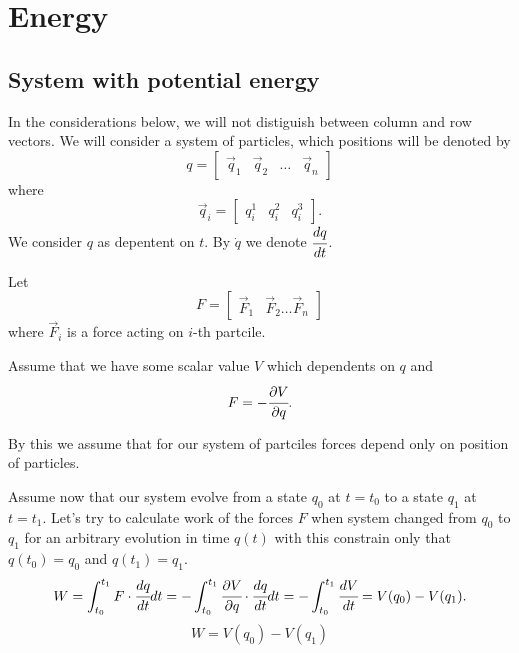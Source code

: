 \documentclass[main.tex]{subfiles}
\begin{document}
\section{Energy}
\subsection{System with potential energy}
\label{potential_energy}
In the considerations below, we will not distiguish between column and row vectors.
We will consider a system of particles, which positions will be denoted by
\begin{equation}
q = 
\begin{bmatrix}
\vec{q}_1 &
\vec{q}_2 &
\dots &
\vec{q}_n 
\end{bmatrix}
\end{equation}
where
\begin{equation}
\vec{q}_i = 
\begin{bmatrix}
q^1_i & 
q^2_i & 
q^3_i
\end{bmatrix}.
\end{equation}
We consider $q$ as depentent on $t$. By $\dot{q}$ we denote $\cfrac{dq}{dt}$.


Let
\begin{equation}
F = 
\begin{bmatrix}
\vec{F}_1 & \vec{F}_2 \dots \vec{F}_n
\end{bmatrix}
\end{equation} 
where $\vec{F}_i$ is a force acting on $i$-th partcile.

Assume that we have some scalar value $V$ which dependents on $q$ and
\begin{equation}
\label{force_in_potential}
F = -\cfrac{\partial V}{\partial q}.
\end{equation}

By this we assume that for our system of partciles forces depend only on position of particles.

Assume now that our system evolve from a state $q_0$ at $t=t_0$ to a state $q_1$ at $t=t_1$. Let's try to calculate work of the forces $F$ when system changed from $q_0$ to $q_1$ for an arbitrary evolution in time $q(t)$ with this constrain only that $q(t_0) = q_0$ and $q(t_1) = q_1$.
\begin{equation}
W = \int_{t_0}^{t_1} F\cdot \cfrac{dq}{dt} dt=-\int_{t_0}^{t_1} \cfrac{\partial V}{\partial q}\cdot \cfrac{dq}{dt} dt = - \int_{t_0}^{t_1} \cfrac{dV}{dt} = V(q_0) - V(q_1).
\end{equation}
\begin{equation}
\boxed{
W = V(q_0) - V(q_1)
}
\end{equation}
\end{document}
